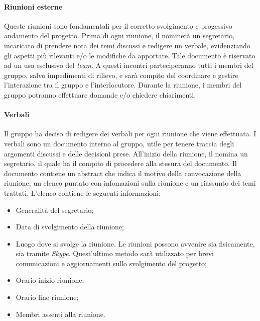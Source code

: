 			\paragraph{Riunioni esterne}
			Queste riunioni sono fondamentali per il corretto svolgimento e progessivo andamento del progetto. Prima di ogni riunione, il \textit{\RdP} nominerà un segretario, incaricato di prendere nota dei temi discussi e redigere un verbale, evidenziando gli aspetti più rilevanti e/o le modifiche da apportare. Tale documento è riservato ad un uso esclusivo del \textit{team}.
			A questi incontri parteciperanno tutti i membri del gruppo, salvo impedimenti di rilievo, e sarà compito del \textit{\RdP} coordinare e gestire l’interazione tra il gruppo e l’interlocutore. Durante la riunione, i membri del gruppo potranno effettuare domande e/o chiedere chiarimenti. 
			
			\paragraph{Verbali}
			Il gruppo ha deciso di redigere dei verbali per ogni riunione che viene effettuata. I verbali sono un documento interno al gruppo, utile per tenere traccia degli argomenti discussi e delle decisioni prese. All'inizio della riunione, il \textit{\RdP} nomina un segretario, il quale ha il compito di procedere alla stesura del documento. Il documento contiene un abstract che indica il motivo della convocazione della riunione, un elenco puntato con infomazioni sulla riunione e un riassunto dei temi trattati. L'elenco contiene le seguenti informazioni:
			\begin{itemize}
				\item Generalità del segretario;
				\item Data di svolgimento della riunione;
				\item Luogo dove si svolge la riunione. Le riunioni possono avvenire sia fisicamente, sia tramite \textit{Skype}. Quest'ultimo metodo sarà utilizzato per brevi comunicazioni e aggiornamenti sullo svolgimento del progetto;
				\item Orario inizio riunione;
				\item Orario fine riunione;
				\item Membri assenti alla riunione.
			\end{itemize}


